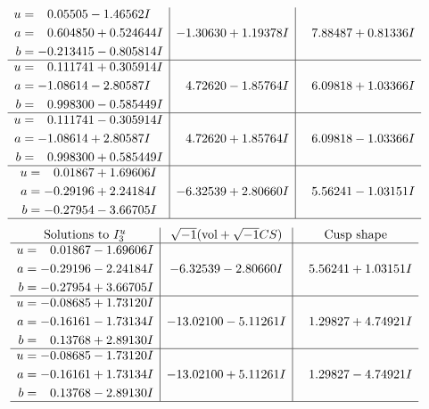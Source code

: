 \documentclass[1p]{elsarticle_modified}
\theoremstyle{definition}
\newcommand{\I}{\sqrt{-1}}
\begin{document}
$$\begin{array}{c|c|c}
\begin{aligned}
u &= \phantom{-}0.05505 - 1.46562 I \\
a &= \phantom{-}0.604850 + 0.524644 I \\
b &= -0.213415 - 0.805814 I\end{aligned}
 & -1.30630 + 1.19378 I & \phantom{-}7.88487 + 0.81336 I \\ \hline\begin{aligned}
u &= \phantom{-}0.111741 + 0.305914 I \\
a &= -1.08614 - 2.80587 I \\
b &= \phantom{-}0.998300 - 0.585449 I\end{aligned}
 & \phantom{-}4.72620 - 1.85764 I & \phantom{-}6.09818 + 1.03366 I \\ \hline\begin{aligned}
u &= \phantom{-}0.111741 - 0.305914 I \\
a &= -1.08614 + 2.80587 I \\
b &= \phantom{-}0.998300 + 0.585449 I\end{aligned}
 & \phantom{-}4.72620 + 1.85764 I & \phantom{-}6.09818 - 1.03366 I \\ \hline\begin{aligned}
u &= \phantom{-}0.01867 + 1.69606 I \\
a &= -0.29196 + 2.24184 I \\
b &= -0.27954 - 3.66705 I\end{aligned}
 & -6.32539 + 2.80660 I & \phantom{-}5.56241 - 1.03151 I\\
 \hline 
 \end{array}$$\newpage$$\begin{array}{c|c|c}  
\text{Solutions to }I^u_{3}& \I (\text{vol} + \sqrt{-1}CS) & \text{Cusp shape}\\
 \hline 
\begin{aligned}
u &= \phantom{-}0.01867 - 1.69606 I \\
a &= -0.29196 - 2.24184 I \\
b &= -0.27954 + 3.66705 I\end{aligned}
 & -6.32539 - 2.80660 I & \phantom{-}5.56241 + 1.03151 I \\ \hline\begin{aligned}
u &= -0.08685 + 1.73120 I \\
a &= -0.16161 - 1.73134 I \\
b &= \phantom{-}0.13768 + 2.89130 I\end{aligned}
 & -13.02100 - 5.11261 I & \phantom{-}1.29827 + 4.74921 I \\ \hline\begin{aligned}
u &= -0.08685 - 1.73120 I \\
a &= -0.16161 + 1.73134 I \\
b &= \phantom{-}0.13768 - 2.89130 I\end{aligned}
 & -13.02100 + 5.11261 I & \phantom{-}1.29827 - 4.74921 I\\
 \hline 
 \end{array}$$\newpage
\end{document}
